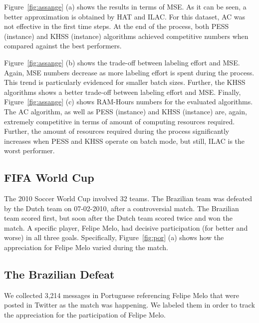\documentclass{sig-alternate}
\begin{document}
Figure~\ref{fig:assange} (a) shows the results in terms of MSE.
As it can be seen, a better approximation is obtained by HAT and ILAC.
For this dataset, AC was not effective in the first
time steps. At the end of the process, both PESS (instance) and KHSS (instance) algorithms achieved competitive numbers when compared against the best performers.

Figure~\ref{fig:assange} (b) shows the trade-off between labeling effort and MSE. Again, MSE numbers decrease as more labeling effort is spent during the process. This trend is particularly evidenced for smaller batch sizes. Further, the KHSS algorithms shows a better trade-off between labeling effort and MSE.
Finally, Figure~\ref{fig:assange} (c)
shows RAM-Hours numbers for the evaluated algorithms. The AC algorithm, as well as PESS (instance) and KHSS (instance) are, again, extremely competitive in terms of amount of computing resources required. Further, the amount of resources required during the process significantly increases when PESS and KHSS operate on batch mode, but still, ILAC is the worst performer.

\subsection{FIFA World Cup}

The 2010 Soccer World Cup involved 32 teams. The Brazilian team was defeated by the Dutch team on 07-02-2010, after a controversial match. The Brazilian team scored first, but soon after the Dutch team scored twice and won the match. A specific player, Felipe Melo, had decisive participation (for better and worse) in all three goals. Specifically, Figure~\ref{fig:por} (a) shows how the appreciation for Felipe Melo varied during the match.

\subsection*{The Brazilian Defeat}
We collected 3,214 messages in Portuguese referencing Felipe Melo that were posted in Twitter as the match was happening.
We labeled them in order to track the
appreciation for the participation of Felipe Melo.
\end{document}
